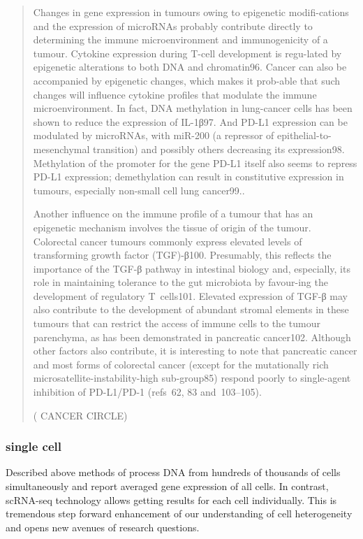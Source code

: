 \documentclass[12pt,]{book}
\theoremstyle{definition}
\theoremstyle{definition}
\theoremstyle{definition}
\theoremstyle{remark}
\begin{document}
\begin{quote}
Changes in gene expression in tumours owing to epigenetic modifi-cations
and the expression of microRNAs probably contribute directly to
determining the immune microenvironment and immunogenicity of a tumour.
Cytokine expression during T-cell development is regu-lated by
epigenetic alterations to both DNA and chromatin96. Cancer can also be
accompanied by epigenetic changes, which makes it prob-able that such
changes will influence cytokine profiles that modulate the immune
microenvironment. In fact, DNA methylation in lung-cancer cells has been
shown to reduce the expression of IL-1β97. And PD-L1 expression can be
modulated by microRNAs, with miR-200 (a repressor of
epithelial-to-mesenchymal transition) and possibly others decreasing its
expression98. Methylation of the promoter for the gene PD-L1 itself also
seems to repress PD-L1 expression; demethylation can result in
constitutive expression in tumours, especially non-small cell lung
cancer99..

Another influence on the immune profile of a tumour that has an
epigenetic mechanism involves the tissue of origin of the tumour.
Colorectal cancer tumours commonly express elevated levels of
transforming growth factor (TGF)-β100. Presumably, this reflects the
importance of the TGF-β pathway in intestinal biology and, especially,
its role in maintaining tolerance to the gut microbiota by favour-ing
the development of regulatory T~cells101. Elevated expression of TGF-β
may also contribute to the development of abundant stromal elements in
these tumours that can restrict the access of immune cells to the tumour
parenchyma, as has been demonstrated in pancreatic cancer102. Although
other factors also contribute, it is interesting to note that pancreatic
cancer and most forms of colorectal cancer (except for the mutationally
rich microsatellite-instability-high sub-group85) respond poorly to
single-agent inhibition of PD-L1/PD-1 (refs~62, 83 and~103--105).

(\citet{IMMUNE} CANCER CIRCLE)
\end{quote}

\hypertarget{single-cell}{%
\subsubsection{single cell}\label{single-cell}}

Described above methods of process DNA from hundreds of thousands of
cells simultaneously and report averaged gene expression of all cells.
In contrast, scRNA-seq technology allows getting results for each cell
individually. This is tremendous step forward enhancement of our
understanding of cell heterogeneity and opens new avenues of research
questions.
\end{document}
